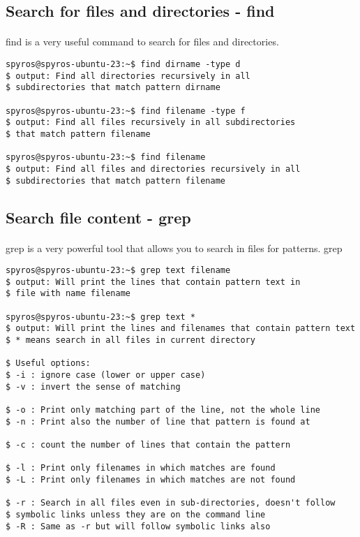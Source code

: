 \documentclass{article}
\begin{document}
\subsection{Search for files and directories - find}
\paragraph{} find is a very useful command to search for files and directories.
\begin{lstlisting}
spyros@spyros-ubuntu-23:~$ find dirname -type d
$ output: Find all directories recursively in all
$ subdirectories that match pattern dirname

spyros@spyros-ubuntu-23:~$ find filename -type f
$ output: Find all files recursively in all subdirectories
$ that match pattern filename

spyros@spyros-ubuntu-23:~$ find filename
$ output: Find all files and directories recursively in all
$ subdirectories that match pattern filename

\end{lstlisting}

\subsection{Search file content - grep}
\paragraph{} grep is a very powerful tool that allows you to search in files for patterns.
grep
\begin{lstlisting}
spyros@spyros-ubuntu-23:~$ grep text filename
$ output: Will print the lines that contain pattern text in
$ file with name filename

spyros@spyros-ubuntu-23:~$ grep text *
$ output: Will print the lines and filenames that contain pattern text
$ * means search in all files in current directory

$ Useful options:
$ -i : ignore case (lower or upper case)
$ -v : invert the sense of matching

$ -o : Print only matching part of the line, not the whole line
$ -n : Print also the number of line that pattern is found at

$ -c : count the number of lines that contain the pattern

$ -l : Print only filenames in which matches are found
$ -L : Print only filenames in which matches are not found

$ -r : Search in all files even in sub-directories, doesn't follow
$ symbolic links unless they are on the command line
$ -R : Same as -r but will follow symbolic links also

\end{lstlisting}
\end{document}
